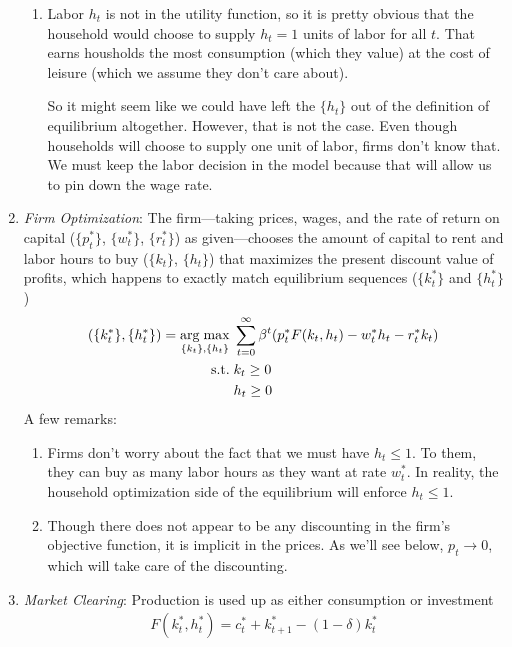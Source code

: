 \documentclass[12pt]{article}
\theoremstyle{plain}
\theoremstyle{definition}
\theoremstyle{remark}
\newcommand{\ra}{\rightarrow}
\DeclareMathOperator*{\argmax}{arg\;max}
\newcommand{\sumtinfz}{\sum^\infty_{t=0}}
\begin{document}
\begin{enumerate}
\begin{enumerate}
      \item Labor $h_t$ is not in the utility function, so it is pretty
        obvious that the household would choose to supply $h_t=1$ units
        of labor for all $t$. That earns housholds the most consumption
        (which they value) at the cost of leisure (which we assume they
        don't care about).

        So it might seem like we could have left the $\{h_t\}$ out of
        the definition of equilibrium altogether. However, that is not
        the case. Even though households will choose to supply one unit
        of labor, firms don't know that. We must keep the labor decision
        in the model because that will allow us to pin down the wage
        rate.
    \end{enumerate}

  \item \emph{Firm Optimization}: The firm---taking
    prices, wages, and the rate of return on capital
    ($\{p^*_t\}$, $\{w^*_t\}$, $\{r^*_t\}$) as given---chooses
    the amount of capital to rent and labor hours to buy
    ($\{k_t\}$, $\{h_t\}$)
    that maximizes the present discount value of profits, which happens
    to exactly match equilibrium sequences
    ($\{k_t^*\}$ and $\{h_t^*\}$)
    \begin{align}
      (\{k_t^*\}, \{h_t^*\})
      =
      \argmax_{\{k_t\}, \{h_t\}}
        \; &\sumtinfz \beta^t (p^*_t F(k_t,h_t) - w^*_t h_t - r^*_t k_t)
        \label{defn:adce-firm-objfcn}\\
      \text{s.t.} \;
      &k_t \geq 0 \notag\\
      &h_t \geq 0 \notag
    \end{align}
    A few remarks:
    \begin{enumerate}
      \item Firms don't worry about the fact that we must have
        $h_t\leq 1$. To them, they can buy as many labor hours as they
        want at rate $w^*_t$. In reality, the household optimization
        side of the equilibrium will enforce $h_t\leq 1$.

      \item Though there does not appear to be any discounting in the
        firm's objective function, it is implicit in the prices. As
        we'll see below, $p_t\ra 0$, which will take care of the
        discounting.
    \end{enumerate}

  \item \emph{Market Clearing}: Production is used up as either
    consumption or investment
    \begin{align*}
      F(k^*_t,h_t^*) = c_t^* + k_{t+1}^* - (1-\delta) k_t^*
    \end{align*}
\end{enumerate}
\end{document}

